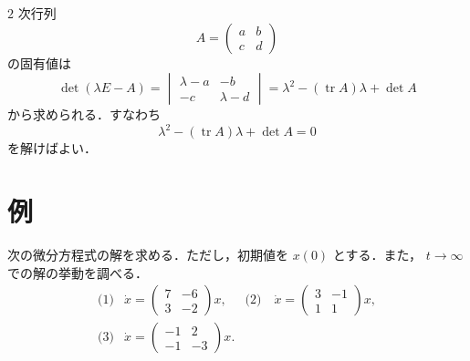 \documentclass[article,paper=a4paper]{jlreq}
\begin{document}
\begin{rem}
$2$ 次行列
\[
  A=
  \begin{pmatrix}
    a & b\\
    c & d
  \end{pmatrix}
\]
の固有値は
\[
  \det(\lambda E-A)
    =
    \begin{vmatrix}
      \lambda-a & -b\\
      -c & \lambda-d
    \end{vmatrix}
    =
    \lambda^2-(\operatorname{tr}A)\lambda+\det A
\]
から求められる．すなわち
\[
  \lambda^2-(\operatorname{tr}A)\lambda+\det A=0
\]
を解けばよい．
\end{rem}

\section{例}

\begin{ex}
次の微分方程式の解を求める．ただし，初期値を $x(0)$ とする．また，
$t\to\infty$ での解の挙動を調べる．
\[
  \begin{array}{lll}
    \text{(1)}&
    \displaystyle
    \dot{x}=
    \begin{pmatrix}
      7 & -6\\
      3 & -2
    \end{pmatrix}x,
    &
    \text{(2)}\quad 
    \displaystyle
    \dot{x}=
    \begin{pmatrix}
      3 & -1\\
      1 & 1
    \end{pmatrix}x,\\[5mm]
    \text{(3)}&
    \displaystyle
    \dot{x}=
    \begin{pmatrix}
      -1 & 2\\
      -1 & -3
    \end{pmatrix}x.
  \end{array}
\]
\end{ex}
\end{document}
